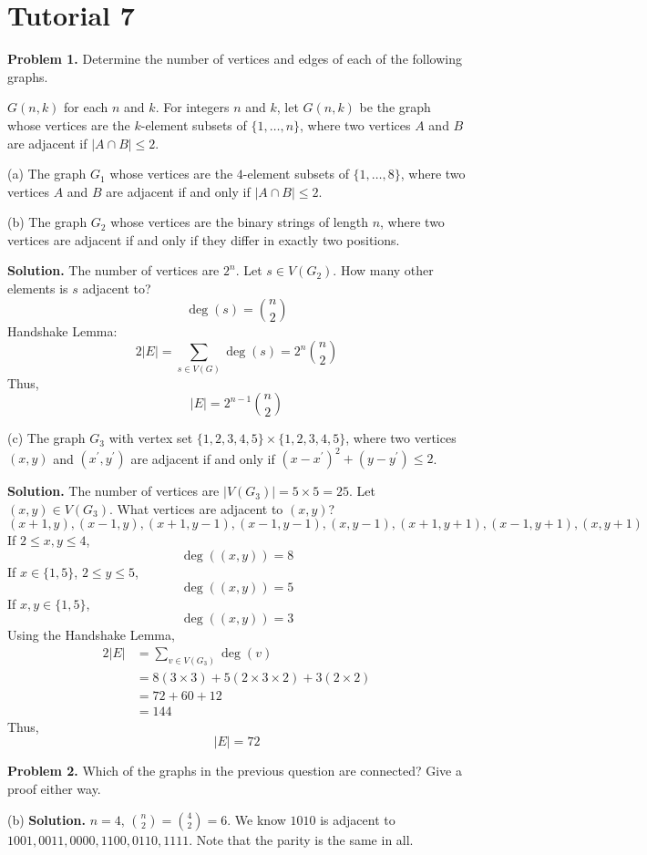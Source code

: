 \section{Tutorial 7}
\textbf{Problem 1.} Determine the number of vertices
and edges of each of the following graphs.

$ G(n,k) $ for each $ n $ and $ k $. For integers $ n $ and $ k $,
let $ G(n,k) $ be the graph whose vertices are the $ k $-element subsets
of $ \{1,\ldots ,n\} $, where two vertices $ A $ and $ B $ are
adjacent if $ |A\cap B|\leqslant 2 $.

(a) The graph $ G_1 $ whose vertices are the $ 4 $-element subsets of
$ \{1,\ldots ,8\} $, where two vertices $ A $ and $ B $ are adjacent
if and only if $ |A\cap B|\leqslant 2 $.

(b) The graph $ G_2 $ whose vertices are the binary strings of length $ n $,
where two vertices are adjacent if and only if they differ in exactly
two positions.

\textbf{Solution.} The number of vertices are $ 2^n $.
Let $ s\in V(G_2) $. How many other elements is $ s $ adjacent to?
\[ \deg(s)=\binom{n}{2} \]
Handshake Lemma:
\[ 2|E|=\sum\limits_{s\in V(G)}\deg(s)=2^n\binom{n}{2} \]
Thus,
\[ |E|=2^{n-1}\binom{n}{2} \]

(c) The graph $ G_3 $ with vertex set $ \{1,2,3,4,5\}\times \{1,2,3,4,5\} $,
where two vertices $ (x,y) $ and $ (x^\prime, y^\prime) $ are
adjacent if and only if $ (x-x^\prime)^2+(y-y^\prime)\leqslant 2 $.

\textbf{Solution.} The number of vertices are $ |V(G_3)|=5\times 5=25 $.
Let $ (x,y)\in V(G_3) $. What vertices are adjacent to $ (x,y) $?
\[ (x+1,y),(x-1,y),(x+1,y-1),(x-1,y-1),(x,y-1),(x+1,y+1),(x-1,y+1),(x,y+1) \]
If $ 2\leqslant x,y \leqslant 4 $,
\[ \deg((x,y))=8 \]
If $ x\in \{1,5\} $, $ 2\leqslant y\leqslant 5 $,
\[ \deg((x,y))=5 \]
If $ x,y\in \{1,5\} $,
\[ \deg((x,y))=3 \]
Using the Handshake Lemma,
\begin{align*}
    2|E|
    &=\sum\limits_{v\in V(G_3)} \deg(v)\\
    &=8(3\times 3)+5(2\times 3\times 2)+3(2\times 2)\\
    &=72+60+12\\
    &=144
\end{align*}
Thus,
\[ |E|=72 \]

\textbf{Problem 2.} Which of the graphs in the previous question are connected?
Give a proof either way.

(b) \textbf{Solution.} $ n=4 $, $ \binom{n}{2}=\binom{4}{2}=6 $.
We know $ 1010 $ is adjacent to $ 1001,0011,0000,1100,0110,1111 $.
Note that the parity is the same in all.


